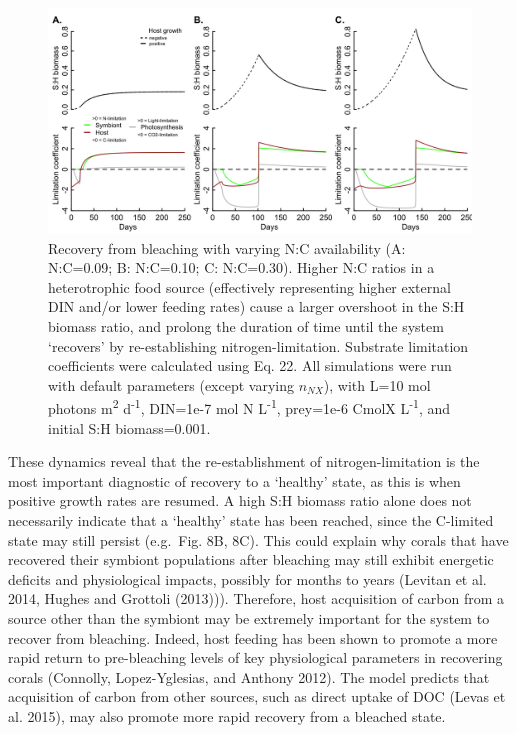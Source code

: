 \documentclass[]{elsarticle} %
\makeatletter
\def\maxwidth{\ifdim\Gin@nat@width>\linewidth\linewidth
\else\Gin@nat@width\fi}
\let\Oldincludegraphics\includegraphics
\renewcommand{\includegraphics}[1]{\Oldincludegraphics[width=\maxwidth]{#1}}
\makeatother
\begin{document}
\begin{figure}[htbp]
\centering
\includegraphics{../img/Fig8.png}
\caption{Recovery from bleaching with varying N:C availability (A:
N:C=0.09; B: N:C=0.10; C: N:C=0.30). Higher N:C ratios in a
heterotrophic food source (effectively representing higher external DIN
and/or lower feeding rates) cause a larger overshoot in the S:H biomass
ratio, and prolong the duration of time until the system `recovers' by
re-establishing nitrogen-limitation. Substrate limitation coefficients
were calculated using Eq. 22. All simulations were run with default
parameters (except varying \(n_{NX}\)), with L=10 mol photons
m\textsuperscript{2} d\textsuperscript{-1}, DIN=1e-7 mol N
L\textsuperscript{-1}, prey=1e-6 CmolX L\textsuperscript{-1}, and
initial S:H biomass=0.001.}
\end{figure}

These dynamics reveal that the re-establishment of nitrogen-limitation
is the most important diagnostic of recovery to a `healthy' state, as
this is when positive growth rates are resumed. A high S:H biomass ratio
alone does not necessarily indicate that a `healthy' state has been
reached, since the C-limited state may still persist (e.g.~Fig. 8B, 8C).
This could explain why corals that have recovered their symbiont
populations after bleaching may still exhibit energetic deficits and
physiological impacts, possibly for months to years (Levitan et al.
2014, Hughes and Grottoli (2013))). Therefore, host acquisition of
carbon from a source other than the symbiont may be extremely important
for the system to recover from bleaching. Indeed, host feeding has been
shown to promote a more rapid return to pre-bleaching levels of key
physiological parameters in recovering corals (Connolly, Lopez-Yglesias,
and Anthony 2012). The model predicts that acquisition of carbon from
other sources, such as direct uptake of DOC (Levas et al. 2015), may
also promote more rapid recovery from a bleached state.
\end{document}
